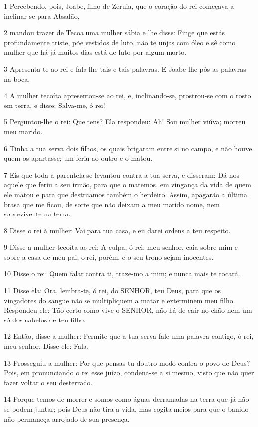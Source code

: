 \par 1 Percebendo, pois, Joabe, filho de Zeruia, que o coração do rei começava a inclinar-se para Absalão,
\par 2 mandou trazer de Tecoa uma mulher sábia e lhe disse: Finge que estás profundamente triste, põe vestidos de luto, não te unjas com óleo e sê como mulher que há já muitos dias está de luto por algum morto.
\par 3 Apresenta-te ao rei e fala-lhe tais e tais palavras. E Joabe lhe pôs as palavras na boca.
\par 4 A mulher tecoíta apresentou-se ao rei, e, inclinando-se, prostrou-se com o rosto em terra, e disse: Salva-me, ó rei!
\par 5 Perguntou-lhe o rei: Que tens? Ela respondeu: Ah! Sou mulher viúva; morreu meu marido.
\par 6 Tinha a tua serva dois filhos, os quais brigaram entre si no campo, e não houve quem os apartasse; um feriu ao outro e o matou.
\par 7 Eis que toda a parentela se levantou contra a tua serva, e disseram: Dá-nos aquele que feriu a seu irmão, para que o matemos, em vingança da vida de quem ele matou e para que destruamos também o herdeiro. Assim, apagarão a última brasa que me ficou, de sorte que não deixam a meu marido nome, nem sobrevivente na terra.
\par 8 Disse o rei à mulher: Vai para tua casa, e eu darei ordens a teu respeito.
\par 9 Disse a mulher tecoíta ao rei: A culpa, ó rei, meu senhor, caia sobre mim e sobre a casa de meu pai; o rei, porém, e o seu trono sejam inocentes.
\par 10 Disse o rei: Quem falar contra ti, traze-mo a mim; e nunca mais te tocará.
\par 11 Disse ela: Ora, lembra-te, ó rei, do SENHOR, teu Deus, para que os vingadores do sangue não se multipliquem a matar e exterminem meu filho. Respondeu ele: Tão certo como vive o SENHOR, não há de cair no chão nem um só dos cabelos de teu filho.
\par 12 Então, disse a mulher: Permite que a tua serva fale uma palavra contigo, ó rei, meu senhor. Disse ele: Fala.
\par 13 Prosseguiu a mulher: Por que pensas tu doutro modo contra o povo de Deus? Pois, em pronunciando o rei esse juízo, condena-se a si mesmo, visto que não quer fazer voltar o seu desterrado.
\par 14 Porque temos de morrer e somos como águas derramadas na terra que já não se podem juntar; pois Deus não tira a vida, mas cogita meios para que o banido não permaneça arrojado de sua presença.
